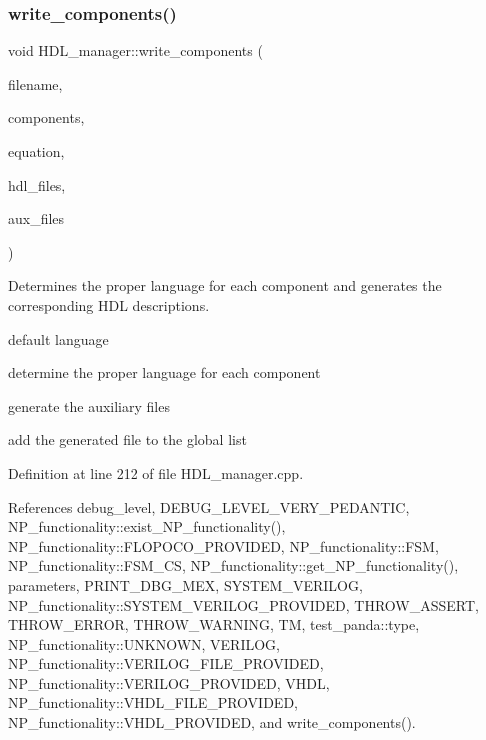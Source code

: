 \subsubsection{\texorpdfstring{write\+\_\+components()}{write\_components()}\hspace{0.1cm}{\footnotesize\ttfamily [2/2]}}
{\footnotesize\ttfamily void H\+D\+L\+\_\+manager\+::write\+\_\+components (\begin{DoxyParamCaption}\item[{const std\+::string \&}]{filename,  }\item[{const std\+::list$<$ \hyperlink{structural__objects_8hpp_a8ea5f8cc50ab8f4c31e2751074ff60b2}{structural\+\_\+object\+Ref} $>$ \&}]{components,  }\item[{bool}]{equation,  }\item[{std\+::list$<$ std\+::string $>$ \&}]{hdl\+\_\+files,  }\item[{std\+::list$<$ std\+::string $>$ \&}]{aux\+\_\+files }\end{DoxyParamCaption})\hspace{0.3cm}{\ttfamily [private]}}



Determines the proper language for each component and generates the corresponding H\+DL descriptions. 

default language

determine the proper language for each component

generate the auxiliary files

add the generated file to the global list 

Definition at line 212 of file H\+D\+L\+\_\+manager.\+cpp.



References debug\+\_\+level, D\+E\+B\+U\+G\+\_\+\+L\+E\+V\+E\+L\+\_\+\+V\+E\+R\+Y\+\_\+\+P\+E\+D\+A\+N\+T\+IC, N\+P\+\_\+functionality\+::exist\+\_\+\+N\+P\+\_\+functionality(), N\+P\+\_\+functionality\+::\+F\+L\+O\+P\+O\+C\+O\+\_\+\+P\+R\+O\+V\+I\+D\+ED, N\+P\+\_\+functionality\+::\+F\+SM, N\+P\+\_\+functionality\+::\+F\+S\+M\+\_\+\+CS, N\+P\+\_\+functionality\+::get\+\_\+\+N\+P\+\_\+functionality(), parameters, P\+R\+I\+N\+T\+\_\+\+D\+B\+G\+\_\+\+M\+EX, S\+Y\+S\+T\+E\+M\+\_\+\+V\+E\+R\+I\+L\+OG, N\+P\+\_\+functionality\+::\+S\+Y\+S\+T\+E\+M\+\_\+\+V\+E\+R\+I\+L\+O\+G\+\_\+\+P\+R\+O\+V\+I\+D\+ED, T\+H\+R\+O\+W\+\_\+\+A\+S\+S\+E\+RT, T\+H\+R\+O\+W\+\_\+\+E\+R\+R\+OR, T\+H\+R\+O\+W\+\_\+\+W\+A\+R\+N\+I\+NG, TM, test\+\_\+panda\+::type, N\+P\+\_\+functionality\+::\+U\+N\+K\+N\+O\+WN, V\+E\+R\+I\+L\+OG, N\+P\+\_\+functionality\+::\+V\+E\+R\+I\+L\+O\+G\+\_\+\+F\+I\+L\+E\+\_\+\+P\+R\+O\+V\+I\+D\+ED, N\+P\+\_\+functionality\+::\+V\+E\+R\+I\+L\+O\+G\+\_\+\+P\+R\+O\+V\+I\+D\+ED, V\+H\+DL, N\+P\+\_\+functionality\+::\+V\+H\+D\+L\+\_\+\+F\+I\+L\+E\+\_\+\+P\+R\+O\+V\+I\+D\+ED, N\+P\+\_\+functionality\+::\+V\+H\+D\+L\+\_\+\+P\+R\+O\+V\+I\+D\+ED, and write\+\_\+components().

